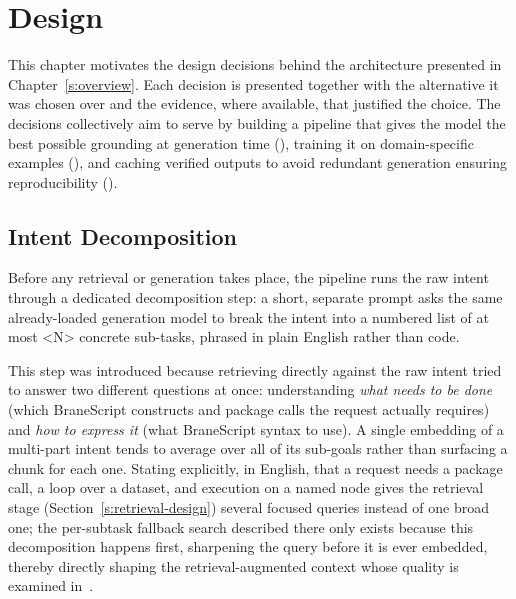 \chapter{Design}\label{s:design}

This chapter motivates the design decisions behind the architecture presented
in Chapter~\ref{s:overview}. Each decision is presented together with the
alternative it was chosen over and the evidence, where available, that
justified the choice. The decisions collectively aim to serve  by
building a pipeline that gives the model the best possible grounding at
generation time (), training it on domain-specific examples (),
and caching verified outputs to avoid redundant generation ensuring reproducibility ().

\section{Intent Decomposition}\label{s:decomposition}

Before any retrieval or generation takes place, the pipeline runs the raw
intent through a dedicated decomposition step: a short,
separate prompt asks the same already-loaded generation model to break the
intent into a numbered list of at most <N> concrete sub-tasks, phrased in
plain English rather than code. 

This step was introduced because retrieving directly against the raw intent
tried to answer two different questions at once:
understanding \emph{what needs to be done} (which BraneScript constructs and
package calls the request actually requires) and \emph{how to express it}
(what BraneScript syntax to use). A single embedding of a multi-part
intent tends to average over all of its sub-goals rather than surfacing a
chunk for each one. Stating explicitly, in English, that a request needs a
package call, a loop over a dataset, and execution on a named node gives the
retrieval stage (Section~\ref{s:retrieval-design}) several focused queries
instead of one broad one; the per-subtask fallback search described there
only exists because this decomposition happens first, sharpening the query
before it is ever embedded, thereby directly shaping the
retrieval-augmented context whose quality is examined in~.

